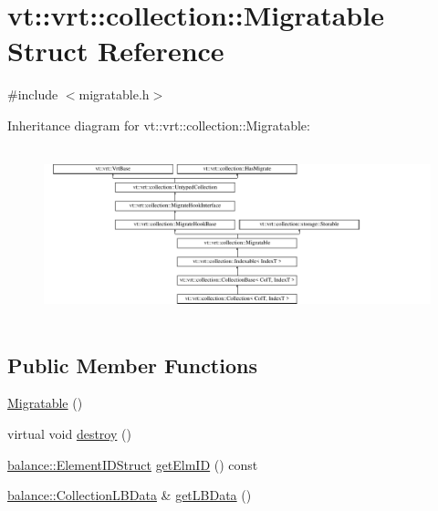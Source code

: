 \hypertarget{structvt_1_1vrt_1_1collection_1_1_migratable}{}\section{vt\+:\+:vrt\+:\+:collection\+:\+:Migratable Struct Reference}
\label{structvt_1_1vrt_1_1collection_1_1_migratable}


{\ttfamily \#include $<$migratable.\+h$>$}

Inheritance diagram for vt\+:\+:vrt\+:\+:collection\+:\+:Migratable\+:\begin{figure}[H]
\begin{center}
\leavevmode
\includegraphics[height=5.028059cm]{structvt_1_1vrt_1_1collection_1_1_migratable}
\end{center}
\end{figure}
\subsection*{Public Member Functions}
\begin{DoxyCompactItemize}
\item 
\hyperlink{structvt_1_1vrt_1_1collection_1_1_migratable_a598f0bb3acfb602d437eab3625b105c5}{Migratable} ()
\item 
virtual void \hyperlink{structvt_1_1vrt_1_1collection_1_1_migratable_a31effa8f54013d1a1794cd025c24e410}{destroy} ()
\item 
\hyperlink{namespacevt_1_1vrt_1_1collection_1_1balance_a9f5b53fafb270212279a4757d2c4cd28}{balance\+::\+Element\+I\+D\+Struct} \hyperlink{structvt_1_1vrt_1_1collection_1_1_migratable_a1b074bbe076e5eb0f83141e4b4504afe}{get\+Elm\+ID} () const
\item 
\hyperlink{structvt_1_1vrt_1_1collection_1_1balance_1_1_collection_l_b_data}{balance\+::\+Collection\+L\+B\+Data} \& \hyperlink{structvt_1_1vrt_1_1collection_1_1_migratable_a602377d46872d608981caf13d742d3d0}{get\+L\+B\+Data} ()
\end{DoxyCompactItemize}
